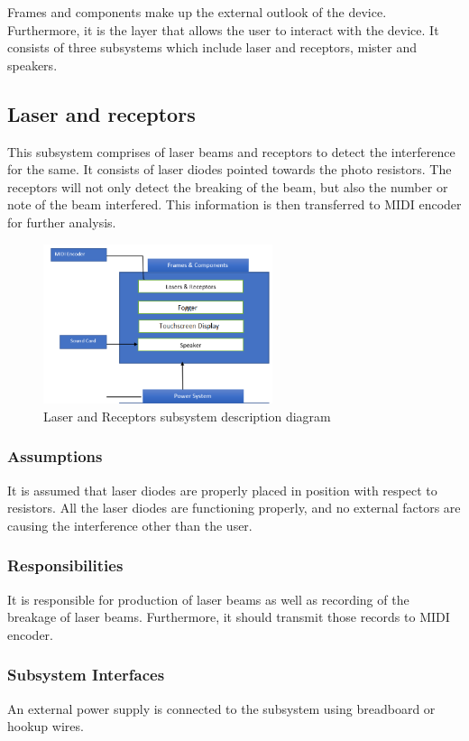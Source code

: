 Frames and components make up the external outlook of the device. Furthermore, it is the layer that allows the user to interact with the device. It consists of three subsystems which include laser and receptors, mister and speakers. 

\subsection{Laser and receptors}
This subsystem comprises of laser beams and receptors to detect the interference for the same. It consists of laser diodes pointed towards the photo resistors.  The receptors will not only detect the breaking of the beam, but also the number or note of the beam interfered. This information is then transferred to MIDI encoder for further analysis.

\begin{figure}[h!]
	\centering
 	\includegraphics[width=0.60\textwidth]{images/Frame}
 \caption{Laser and Receptors subsystem description diagram}
\end{figure}

\subsubsection{Assumptions}
It is assumed that laser diodes are properly placed in position with respect to resistors. All the laser diodes are functioning properly, and no external factors are causing the interference other than the user.

\subsubsection{Responsibilities}
It is responsible for production of laser beams as well as recording of the breakage of laser beams. Furthermore, it should transmit those records to MIDI encoder.

\subsubsection{Subsystem Interfaces}
An external power supply is connected to the subsystem using breadboard or hookup wires. 

